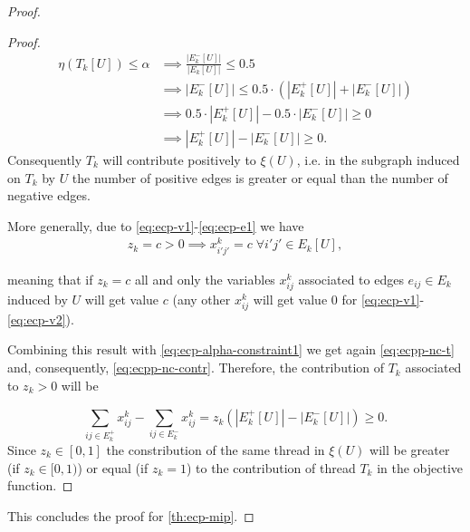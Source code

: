 \begin{proof}
\begin{proof}
		\begin{align}
			\eta(T_k[U]) \leq \alpha & \implies \frac{|E^{-}_{k}[U]|}{|E_{k}[U]|}
			\leq 0.5                                                                                            \\
			                         & \implies |E^{-}_{k}[U]| \leq 0.5 \cdot (|E^{+}_{k}[U]| + |E^{-}_{k}[U]|) \\
			                         & \implies 0.5 \cdot |E^{+}_{k}[U]| - 0.5 \cdot |E^{-}_{k}[U]| \geq 0      \\
			\label{eq:ecpp-nc-contr}
			                         & \implies |E^{+}_{k}[U]| - |E^{-}_{k}[U]|
			\geq 0.
		\end{align}
		Consequently $T_k$ will contribute positively to $\xi(U)$, i.e.
		in the subgraph induced on $T_k$ by $U$
		the number of positive edges is greater or equal than the
		number of negative edges.

		More generally, due to \eqref{eq:ecp-v1}-\eqref{eq:ecp-e1} we have
		\begin{gather*}
			z_k = c > 0 \implies x_{i'j'}^{k} = c \; \forall i'j'
			\in E_k[U],
		\end{gather*}

		meaning that if $z_k = c$ all and only the variables $x_{ij}^{k}$
		associated to edges $e_{ij} \in E_k$ induced by $U$
		will get value $c$ (any other $x_{ij}^{k}$ will get value $0$ for
		\eqref{eq:ecp-v1}-\eqref{eq:ecp-v2}).

		Combining this result with \eqref{eq:ecp-alpha-constraint1} we get
		again \eqref{eq:ecpp-nc-t} and, consequently, \eqref{eq:ecpp-nc-contr}.
		Therefore, the contribution of $T_k$ associated to $z_k > 0$ will be

		\begin{equation}
			\sum^{}_{ij \in E^{+}_k } x_{ij}
				^{k} - \sum_{ij \in E^{-}_k } x_{ij} ^{k} = z_k (|E^{+}_{k}[U]| -
			|E^{-}_{k}[U]|) \geq 0.
		\end{equation}
		Since $z_k \in [0, 1]$ the constribution of the same thread in $\xi(U)$
		will be greater (if $z_k \in [0, 1)$) or equal (if $z_k = 1$) to the
		contribution of thread $T_k$ in the objective function.

	\end{proof}

	This concludes the proof for \autoref{th:ecp-mip}.
\end{proof}

